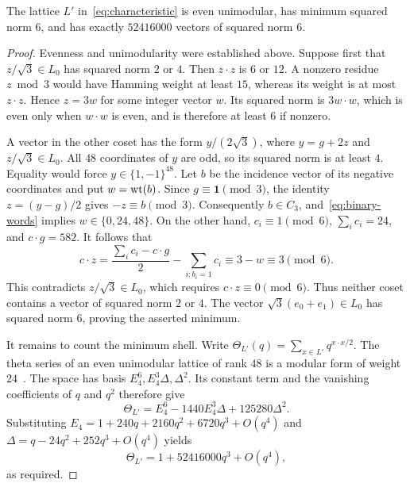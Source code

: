 \begin{theorem}\label{thm:p48-shell}
The lattice $L'$ in~\eqref{eq:characteristic} is even unimodular,
has minimum squared norm $6$, and has exactly $52416000$ vectors of
squared norm $6$.
\end{theorem}
\begin{proof}
Evenness and unimodularity were established above. Suppose first that
$z/\sqrt3\in L_0$ has squared norm $2$ or $4$. Then $z\cdot z$ is
$6$ or $12$. A nonzero residue $z\bmod3$ would have Hamming weight
at least $15$, whereas its weight is at most $z\cdot z$. Hence
$z=3w$ for some integer vector $w$. Its squared norm is $3w\cdot w$,
which is even only when $w\cdot w$ is even, and is therefore at least
$6$ if nonzero.

A vector in the other coset has the form $y/(2\sqrt3)$, where
$y=g+2z$ and $z/\sqrt3\in L_0$. All $48$ coordinates of $y$ are odd,
so its squared norm is at least $4$. Equality would force
$y\in\{1,-1\}^{48}$. Let $b$ be the incidence vector of its negative
coordinates and put $w=\operatorname{wt}(b)$. Since $g\equiv\boldsymbol1\pmod3$,
the identity $z=(y-g)/2$ gives $-z\equiv b\pmod3$. Consequently
$b\in C_3$, and~\eqref{eq:binary-words} implies $w\in\{0,24,48\}$.
On the other hand, $c_i\equiv1\pmod6$, $\sum_i c_i=24$, and
$c\cdot g=582$. It follows that
\begin{equation}\label{eq:odd-parity}
 c\cdot z
 =\frac{\sum_i c_i-c\cdot g}{2}-\sum_{i:b_i=1}c_i
 \equiv3-w\equiv3\pmod6.
\end{equation}
This contradicts $z/\sqrt3\in L_0$, which requires
$c\cdot z\equiv0\pmod6$. Thus neither coset contains a vector of
squared norm $2$ or $4$. The vector $\sqrt3(e_0+e_1)\in L_0$
has squared norm $6$, proving the asserted minimum.

It remains to count the minimum shell. Write
$\Theta_{L'}(q)=\sum_{x\in L'}q^{x\cdot x/2}$. The theta series of
an even unimodular lattice of rank $48$ is a modular form of weight
$24$~\cite{conway1999sphere,mos}. The space has basis
$E_4^6,E_4^3\Delta,\Delta^2$. Its constant term and the vanishing
coefficients of $q$ and $q^2$ therefore give
\begin{equation}\label{eq:theta48}
 \Theta_{L'}=E_4^6-1440E_4^3\Delta+125280\Delta^2.
\end{equation}
Substituting
$E_4=1+240q+2160q^2+6720q^3+O(q^4)$ and
$\Delta=q-24q^2+252q^3+O(q^4)$ yields
\[
 \Theta_{L'}=1+52416000q^3+O(q^4),
\]
as required.
\end{proof}

